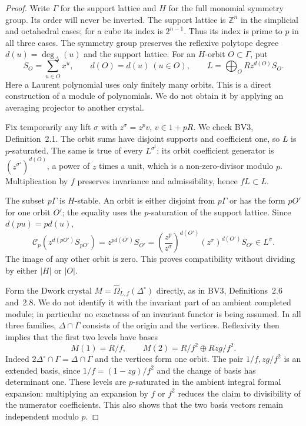 \documentclass[11pt,a4paper]{article}
\theoremstyle{definition}\newtheorem{definition}[theorem]{Definition}
\theoremstyle{remark}\newtheorem{remark}[theorem]{Remark}
\numberwithin{equation}{section}
\begin{document}
\begin{proof}
Write $\Gamma$ for the support lattice and $H$ for the full monomial
symmetry group. Its order will never be inverted. The support lattice
is $\mathbb Z^n$ in the simplicial and octahedral cases; for a cube its
index is $2^{n-1}$. Thus its index is prime to $p$ in all three cases.
The symmetry group preserves the reflexive polytope degree
$d(u)=\deg_\Delta(u)$ and the support lattice. For an $H$-orbit
$O\subset\Gamma$, put
\[
 S_O=\sum_{u\in O}x^u,\qquad d(O)=d(u)\ (u\in O),\qquad
 L=\bigoplus_O R z^{d(O)}S_O.
\]
Here a Laurent polynomial uses only finitely many orbits.
This is a direct construction of a module of polynomials. We do not
obtain it by applying an averaging projector to another crystal.

Fix temporarily any lift $\sigma$ with
$z^\sigma=z^pv$, $v\in1+pR$. We check BV3, Definition~2.1.
The orbit sums have disjoint supports and coefficient one, so $L$ is
$p$-saturated. The same is true of every $L^{\sigma^i}$: its orbit
coefficient generator is $(z^{\sigma^i})^{d(O)}$, a power of $z$
times a unit, which is a non-zero-divisor modulo $p$.
Multiplication by $f$ preserves invariance and admissibility, hence
$fL\subset L$.

The subset $p\Gamma$ is $H$-stable. An orbit is either disjoint from
$p\Gamma$ or has the form $pO'$ for one orbit $O'$; the equality uses
the $p$-saturation of the support lattice. Since $d(pu)=pd(u)$,
\[
 \mathscr C_p(z^{d(pO')}S_{pO'})
   =z^{pd(O')}S_{O'}
   =\left(\frac{z^p}{z^\sigma}\right)^{d(O')}
        (z^\sigma)^{d(O')}S_{O'}\in L^\sigma.
\]
The image of any other orbit is zero. This proves compatibility
without dividing by either $|H|$ or $|O|$.

Form the Dwork crystal
$M=\widehat\Omega_{L,f}(\Delta^\circ)$ directly, as in BV3,
Definitions~2.6 and~2.8. We do not identify it with the invariant
part of an ambient completed module; in particular no exactness of
an invariant functor is being assumed. In all three families,
$\Delta\cap\Gamma$ consists of the origin and the vertices.
Reflexivity then implies that the first two levels have bases
\[
 M(1)=R/f,\qquad M(2)=R/f^2\oplus Rzg/f^2.
\]
Indeed $2\Delta^\circ\cap\Gamma=\Delta\cap\Gamma$ and the
vertices form one orbit. The pair $1/f,zg/f^2$ is an extended basis,
since $1/f=(1-zg)/f^2$ and the change of basis has determinant one.
These levels are $p$-saturated in the ambient integral formal
expansion: multiplying an expansion by $f$ or $f^2$ reduces the
claim to divisibility of the numerator coefficients. This also
shows that the two basis vectors remain independent modulo $p$.


\end{proof}
\end{document}
